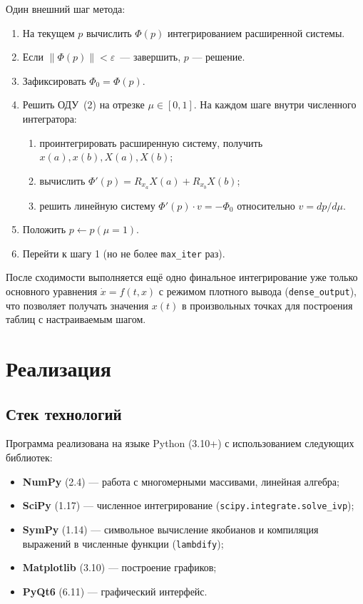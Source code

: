 \documentclass[12pt]{article}
\begin{document}
Один внешний шаг метода:
\begin{enumerate}
  \item На текущем $p$ вычислить $\Phi(p)$ интегрированием расширенной системы.
  \item Если $\|\Phi(p)\| < \varepsilon$~--- завершить, $p$ --- решение.
  \item Зафиксировать $\Phi_0 = \Phi(p)$.
  \item Решить ОДУ~(2) на отрезке $\mu \in [0, 1]$. На каждом шаге внутри численного интегратора:
  \begin{enumerate}
    \item проинтегрировать расширенную систему, получить $x(a), x(b), X(a), X(b)$;
    \item вычислить $\Phi'(p) = R_{x_a} X(a) + R_{x_b} X(b)$;
    \item решить линейную систему $\Phi'(p) \cdot v = -\Phi_0$ относительно $v = dp/d\mu$.
  \end{enumerate}
  \item Положить $p \leftarrow p(\mu = 1)$.
  \item Перейти к шагу 1 (но не более \texttt{max\_iter} раз).
\end{enumerate}

После сходимости выполняется ещё одно финальное интегрирование уже только основного уравнения $\dot{x} = f(t, x)$ с режимом плотного вывода (\texttt{dense\_output}), что позволяет получать значения $x(t)$ в произвольных точках для построения таблиц с настраиваемым шагом.

\section{Реализация}

\subsection{Стек технологий}

Программа реализована на языке Python (3.10+) с использованием следующих библиотек:
\begin{itemize}
  \item \textbf{NumPy} (2.4) --- работа с многомерными массивами, линейная алгебра;
  \item \textbf{SciPy} (1.17) --- численное интегрирование (\texttt{scipy.integrate.solve\_ivp});
  \item \textbf{SymPy} (1.14) --- символьное вычисление якобианов и компиляция выражений в численные функции (\texttt{lambdify});
  \item \textbf{Matplotlib} (3.10) --- построение графиков;
  \item \textbf{PyQt6} (6.11) --- графический интерфейс.
\end{itemize}
\end{document}
